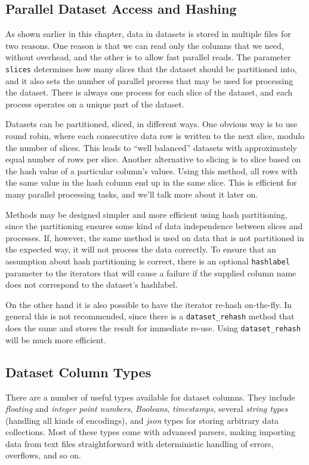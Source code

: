 \subsection{Parallel Dataset Access and Hashing}
As shown earlier in this chapter, data in datasets is stored in
multiple files for two reasons.  One reason is that we can read only
the columns that we need, without overhead, and the other is to allow
fast parallel reads.  The parameter \texttt{slices} determines how
many slices that the dataset should be partitioned into, and it also
sets the number of parallel process that may be used for processing
the dataset.  There is always one process for each slice of the
dataset, and each process operates on a unique part of the dataset.

Datasets can be partitioned, sliced, in different ways.  One obvious
way is to use round robin, where each consecutive data row is written
to the next slice, modulo the number of slices.  This leads to ``well
balanced'' datasets with approximately equal number of rows per slice.
Another alternative to slicing is to slice based on the hash value of
a particular column's values.  Using this method, all rows with the
same value in the hash column end up in the same slice.  This is
efficient for many parallel processing tasks, and we'll talk more
about it later on.

Methods may be designed simpler and more efficient using hash
partitioning, since the partitioning ensures some kind of data
independence between slices and processes.  If, however, the same
method is used on data that is not partitioned in the expected way, it
will not process the data correctly.  To ensure that an assumption
about hash partitioning is correct, there is an optional
\texttt{hashlabel} parameter to the iterators that will cause a
failure if the supplied column name does not correspond to the
dataset's hashlabel.

On the other hand it is also possible to have the iterator re-hash
on-the-fly.  In general this is not recommended, since there is a
\texttt{dataset\_rehash} method that does the same and stores the
result for immediate re-use.  Using \texttt{dataset\_rehash} will be
much more efficient.




\subsection{Dataset Column Types}

There are a number of useful types available for dataset columns.
They include \textsl{floating} and \textsl{integer point numbers},
\textsl{Booleans}, \textsl{timestamps}, several \textsl{string types}
(handling all kinds of encodings), and \textsl{json} types for storing
arbitrary data collections.  Most of these types come with advanced
parsers, making importing data from text files straightforward with
deterministic handling of errors, overflows, and so on.



